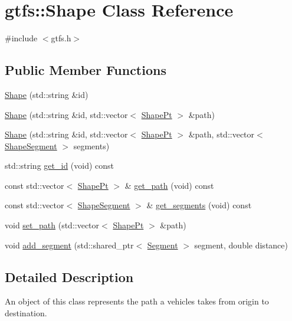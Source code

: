 \hypertarget{classgtfs_1_1Shape}{}\section{gtfs\+:\+:Shape Class Reference}
\label{classgtfs_1_1Shape}


{\ttfamily \#include $<$gtfs.\+h$>$}

\subsection*{Public Member Functions}
\begin{DoxyCompactItemize}
\item 
\hyperlink{classgtfs_1_1Shape_ace6a58f57452ab0d2830b518a0ed2bde}{Shape} (std\+::string \&id)
\item 
\hyperlink{classgtfs_1_1Shape_a17adce0bcc4f7f7b159a08f8fa8eed56}{Shape} (std\+::string \&id, std\+::vector$<$ \hyperlink{structgtfs_1_1ShapePt}{Shape\+Pt} $>$ \&path)
\item 
\hyperlink{classgtfs_1_1Shape_af7205aeb0d641d27e01df87a8351283e}{Shape} (std\+::string \&id, std\+::vector$<$ \hyperlink{structgtfs_1_1ShapePt}{Shape\+Pt} $>$ \&path, std\+::vector$<$ \hyperlink{structgtfs_1_1ShapeSegment}{Shape\+Segment} $>$ segments)
\item 
std\+::string \hyperlink{classgtfs_1_1Shape_ad829fc5da27e6402265864d647c08d1f}{get\+\_\+id} (void) const 
\item 
const std\+::vector$<$ \hyperlink{structgtfs_1_1ShapePt}{Shape\+Pt} $>$ \& \hyperlink{classgtfs_1_1Shape_a2a8840b13035b44e97ce4a0b56e39d9c}{get\+\_\+path} (void) const 
\item 
const std\+::vector$<$ \hyperlink{structgtfs_1_1ShapeSegment}{Shape\+Segment} $>$ \& \hyperlink{classgtfs_1_1Shape_a7202518006f474db4e8005ad8b9d4055}{get\+\_\+segments} (void) const 
\item 
void \hyperlink{classgtfs_1_1Shape_a39e7bb353e89f954d36eb7f9ca4820b9}{set\+\_\+path} (std\+::vector$<$ \hyperlink{structgtfs_1_1ShapePt}{Shape\+Pt} $>$ \&path)
\item 
void \hyperlink{classgtfs_1_1Shape_afb5bfd99bafb82eb085198218fe13342}{add\+\_\+segment} (std\+::shared\+\_\+ptr$<$ \hyperlink{classgtfs_1_1Segment}{Segment} $>$ segment, double distance)
\end{DoxyCompactItemize}


\subsection{Detailed Description}
An object of this class represents the path a vehicles takes from origin to destination.

